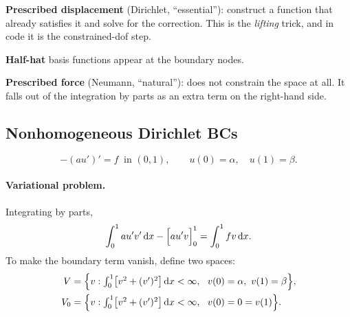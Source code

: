 
\begin{roadmap}[Lecture 5]
\begin{roadlist}
\item \textbf{Prescribed displacement} (Dirichlet, ``essential''): construct a
  function that already satisfies it and solve for the correction. This is the
  \emph{lifting} trick, and in code it is the constrained-dof step.
\item \textbf{Half-hat} basis functions appear at the boundary nodes.
\item \textbf{Prescribed force} (Neumann, ``natural''): does not constrain the
  space at all. It falls out of the integration by parts as an extra term on
  the right-hand side.
\end{roadlist}
\end{roadmap}

\subsection*{Nonhomogeneous Dirichlet BCs}

\begin{equation}\label{eq:nhd}
  -(au')' = f \ \text{ in } (0,1),
  \qquad u(0)=\alpha,\quad u(1)=\beta .
\end{equation}

\paragraph{Variational problem.} Integrating by parts,
\begin{equation}
  \int_{0}^{1} a u'v'\,\mathrm{d} x - \Bigl[a u'v\Bigr]_{0}^{1} = \int_{0}^{1} f v\,\mathrm{d} x .
\end{equation}
To make the boundary term vanish, define two spaces:
\begin{align}
  \Vsp   &= \Bigl\{ v : \textstyle\int_{0}^{1}\bigl[v^{2}+(v')^{2}\bigr]\dx <\infty,\ \ v(0)=\alpha,\ v(1)=\beta \Bigr\},\\
  \Vsp_0 &= \Bigl\{ v : \textstyle\int_{0}^{1}\bigl[v^{2}+(v')^{2}\bigr]\dx <\infty,\ \ v(0)=0=v(1) \Bigr\}.
\end{align}

